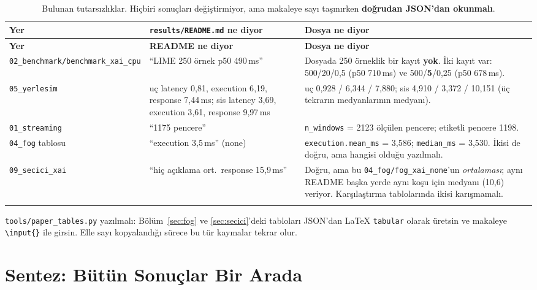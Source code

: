 \documentclass[11pt,a4paper]{report}
\newcommand{\ms}{\,ms}
\newcommand{\kod}[1]{\texttt{\small #1}}
\newcommand{\dosya}[1]{\texttt{\footnotesize #1}}
\begin{document}
\begin{longtable}{@{}p{3.2cm}p{5.2cm}p{5.6cm}@{}}
\toprule
\textbf{Yer} & \textbf{\dosya{results/README.md} ne diyor} & \textbf{Dosya ne diyor} \\
\midrule
\endfirsthead
\toprule
\textbf{Yer} & \textbf{README ne diyor} & \textbf{Dosya ne diyor} \\
\midrule
\endhead
\dosya{02\_benchmark/\newline benchmark\_xai\_cpu} &
``LIME 250 örnek p50 490\ms'' &
Dosyada 250 örneklik bir kayıt \textbf{yok}. İki kayıt var: 500/20/0{,}5 (p50 710\ms) ve 500/\textbf{5}/0{,}25 (p50 678\ms). \\
\addlinespace
\dosya{05\_yerlesim} &
uç latency 0{,}81, execution 6{,}19, response 7{,}44\ms; sis latency 3{,}69, execution 3{,}61, response 9{,}97\ms &
uç 0{,}928 / 6{,}344 / 7{,}880; sis 4{,}910 / 3{,}372 / 10{,}151 (üç tekrarın medyanlarının medyanı). \\
\addlinespace
\dosya{01\_streaming} &
``1175 pencere'' &
\kod{n\_windows} = 2123 ölçülen pencere; etiketli pencere 1198. \\
\addlinespace
\dosya{04\_fog} tablosu &
``execution 3{,}5\ms{}'' (none) &
\kod{execution.mean\_ms} = 3{,}586; \kod{median\_ms} = 3{,}530. İkisi de doğru, ama hangisi olduğu yazılmalı. \\
\addlinespace
\dosya{09\_secici\_xai} &
``hiç açıklama ort.\ response 15{,}9\ms{}'' &
Doğru, ama bu \dosya{04\_fog/fog\_xai\_none}'un \emph{ortalaması}; aynı README başka yerde aynı koşu için medyanı (10{,}6) veriyor. Karşılaştırma tablolarında ikisi karışmamalı. \\
\bottomrule
\caption{Bulunan tutarsızlıklar. Hiçbiri sonuçları değiştirmiyor, ama makaleye
sayı taşınırken \textbf{doğrudan JSON'dan okunmalı}.}
\end{longtable}

\begin{bulgu}[Öneri]
\kod{tools/paper\_tables.py} yazılmalı: Bölüm~\ref{sec:fog} ve
\ref{sec:secici}'deki tabloları JSON'dan LaTeX \kod{tabular} olarak üretsin ve
makaleye \kod{\textbackslash input\{\}} ile girsin. Elle sayı kopyalandığı
sürece bu tür kaymalar tekrar olur.
\end{bulgu}

\chapter{Sentez: Bütün Sonuçlar Bir Arada}
\end{document}
